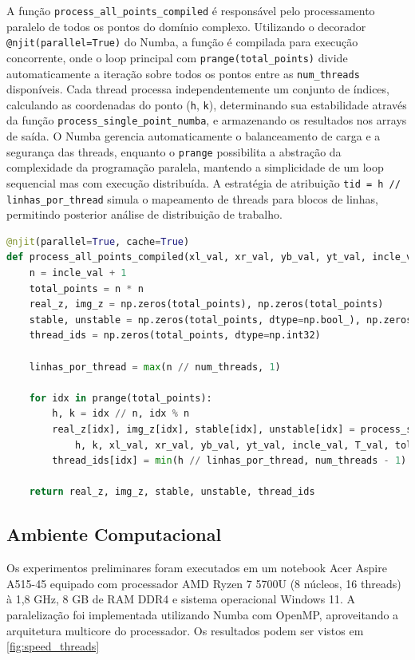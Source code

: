 \documentclass[a4paper,12pt]{article}
\begin{document}
A função \texttt{process\_all\_points\_compiled} é responsável pelo processamento paralelo de todos os pontos do domínio complexo. Utilizando o decorador \texttt{@njit(parallel=True)} do Numba, a função é compilada para execução concorrente, onde o loop principal com \texttt{prange(total\_points)} divide automaticamente a iteração sobre todos os pontos entre as \texttt{num\_threads} disponíveis. Cada thread processa independentemente um conjunto de índices, calculando as coordenadas do ponto (\texttt{h}, \texttt{k}), determinando sua estabilidade através da função \texttt{process\_single\_point\_numba}, e armazenando os resultados nos arrays de saída. O Numba gerencia automaticamente o balanceamento de carga e a segurança das threads, enquanto o \texttt{prange} possibilita a abstração da complexidade da programação paralela, mantendo a simplicidade de um loop sequencial mas com execução distribuída. A estratégia de atribuição \texttt{tid = h // linhas\_por\_thread} simula o mapeamento de threads para blocos de linhas, permitindo posterior análise de distribuição de trabalho.

\begin{lstlisting}[language=Python]
@njit(parallel=True, cache=True)
def process_all_points_compiled(xl_val, xr_val, yb_val, yt_val, incle_val, T_val, tol_val, num_threads):
    n = incle_val + 1
    total_points = n * n
    real_z, img_z = np.zeros(total_points), np.zeros(total_points)
    stable, unstable = np.zeros(total_points, dtype=np.bool_), np.zeros(total_points, dtype=np.bool_)
    thread_ids = np.zeros(total_points, dtype=np.int32)
    
    linhas_por_thread = max(n // num_threads, 1)

    for idx in prange(total_points):
        h, k = idx // n, idx % n
        real_z[idx], img_z[idx], stable[idx], unstable[idx] = process_single_point_numba(
            h, k, xl_val, xr_val, yb_val, yt_val, incle_val, T_val, tol_val)
        thread_ids[idx] = min(h // linhas_por_thread, num_threads - 1)

    return real_z, img_z, stable, unstable, thread_ids
\end{lstlisting}

\subsection{Ambiente Computacional}
Os experimentos preliminares foram executados em um notebook Acer Aspire A515-45 equipado com processador AMD Ryzen 7 5700U (8 núcleos, 16 threads) à 1,8 GHz, 8 GB de RAM DDR4 e sistema operacional Windows 11. A paralelização foi implementada utilizando Numba com OpenMP, aproveitando a arquitetura multicore do processador. Os resultados podem ser vistos em \ref{fig:speed_threads}
\end{document}
